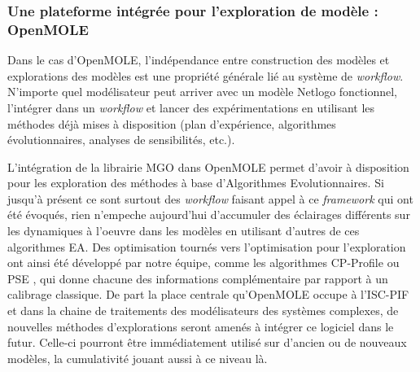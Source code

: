 \subsubsection{Une plateforme intégrée pour l'exploration de modèle : OpenMOLE}


Dans le cas d'OpenMOLE, l'indépendance entre construction des modèles et explorations des modèles est une propriété générale lié au système de \textit{workflow}. N'importe quel modélisateur peut arriver avec un modèle Netlogo fonctionnel, l'intégrer dans un \textit{workflow} et lancer des expérimentations en utilisant les méthodes déjà mises à disposition (plan d'expérience, algorithmes évolutionnaires, analyses de sensibilités, etc.).

L'intégration de la librairie MGO dans OpenMOLE permet d'avoir à disposition pour les exploration des méthodes à base d'Algorithmes Evolutionnaires. Si jusqu'à présent ce sont surtout des \textit{workflow} faisant appel à ce \textit{framework} qui ont été évoqués, rien n'empeche aujourd'hui d'accumuler des éclairages différents sur les dynamiques à l'oeuvre dans les modèles en utilisant d'autres de ces algorithmes EA. Des optimisation tournés vers l'optimisation pour l'exploration ont ainsi été développé par notre équipe, comme les algorithmes CP-Profile \autocite{Reuillon2015} ou PSE \autocite{Cherel2015}, qui donne chacune des informations complémentaire par rapport à un calibrage classique. De part la place centrale qu'OpenMOLE occupe à l'ISC-PIF et dans la chaine de traitements des modélisateurs des systèmes complexes, de nouvelles méthodes d'explorations seront amenés à intégrer ce logiciel dans le futur. Celle-ci pourront être immédiatement utilisé sur d'ancien ou de nouveaux modèles, la cumulativité jouant aussi à ce niveau là.

